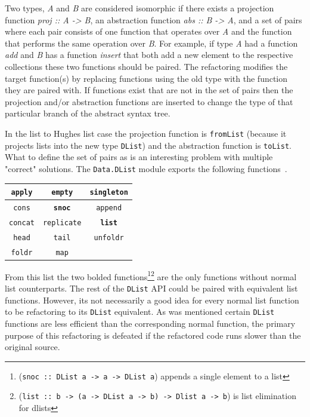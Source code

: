 Two types, \textit{A} and \textit{B} are considered isomorphic if there exists a projection function \textit{proj :: A -> B}, an abstraction function \textit{abs :: B -> A}, and a set of pairs where each pair consists of one function that operates over \textit{A} and the function that performs the same operation over \textit{B}. For example, if type \textit{A} had a function \textit{add} and \textit{B} has a function \textit{insert} that both add a new element to the respective collections these two functions should be paired. The refactoring modifies the target function(s) by replacing functions using the old type with the function they are paired with. If functions exist that are not in the set of pairs then the projection and/or abstraction functions are inserted to change the type of that particular branch of the abstract syntax tree.

In the list to Hughes list case the projection function is \texttt{fromList} (because it projects lists into the new type \texttt{DList}) and the abstraction function is \texttt{toList}. What to define the set of pairs as is an interesting problem with multiple "correct" solutions. The \texttt{Data.DList} module exports the following functions~\citep{dlist}.

\begin{center}
\begin{tabular}{| c | c | c |}
  \hline
  \texttt{apply} & \texttt{empty} & \texttt{singleton}\\
  \hline
  \texttt{cons} & \textbf{\texttt{snoc}} & \texttt{append} \\
  \hline
  \texttt{concat} & \texttt{replicate} & \textbf{\texttt{list}}\\ 
  \hline	
  \texttt{head} & \texttt{tail} & \texttt{unfoldr}\\ 
  \hline  
  \texttt{foldr} & \texttt{map} \\
  \hline
\end{tabular}
\end{center}

From this list the two bolded functions\footnote{(\texttt{snoc :: DList a -> a -> DList a}) appends a single element to a list}\footnote{(\texttt{list :: b -> (a -> DList a -> b) -> Dlist a -> b}) is list elimination for dlists} are the only functions without normal list counterparts. The rest of the \texttt{DList} API could be paired with equivalent list functions. However, its not necessarily a good idea for every normal list function to be refactoring to its \texttt{DList} equivalent. As was mentioned certain \texttt{DList} functions are less efficient than the corresponding normal function, the primary purpose of this refactoring is defeated if the refactored code runs slower than the original source.

